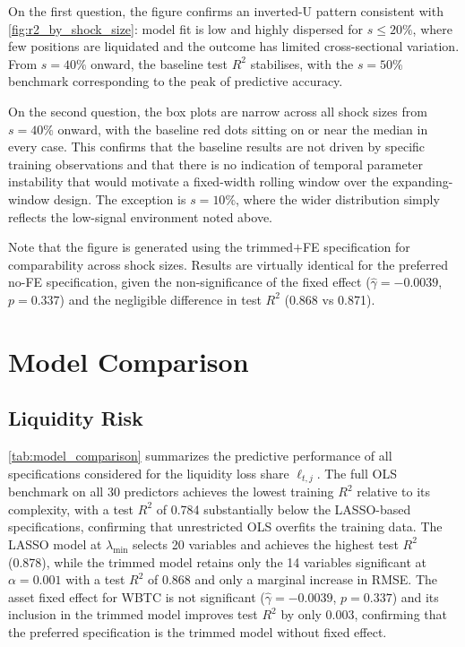 \documentclass[a4paper,UKenglish,cleveref, autoref, thm-restate]{informs3}
\begin{document}
On the first question, the figure confirms an inverted-U pattern
consistent with \autoref{fig:r2_by_shock_size}: model fit is
low and highly dispersed for $s \leq 20\%$, where few positions
are liquidated and the outcome has limited cross-sectional
variation. From $s = 40\%$ onward, the baseline test $R^2$
stabilises, with the $s = 50\%$ benchmark corresponding to the
peak of predictive accuracy.

On the second question, the box plots are narrow across all shock
sizes from $s = 40\%$ onward, with the baseline red dots sitting
on or near the median in every case. This confirms that the baseline results are not driven by specific 
training observations and that there is no indication of temporal 
parameter instability that would motivate a fixed-width rolling window 
over the expanding-window design.
The exception is $s = 10\%$, where the wider distribution simply
reflects the low-signal environment noted above.

Note that the figure is generated using the trimmed$+$FE
specification for comparability across shock sizes. Results are
virtually identical for the preferred no-FE specification, given
the non-significance of the fixed effect ($\hat{\gamma} =
-0.0039$, $p = 0.337$) and the negligible difference in test
$R^2$ (0.868 vs 0.871).


\section{Model Comparison}

\medskip

\subsection{Liquidity Risk}
\label{app:model_comparison_liq}

\autoref{tab:model_comparison} summarizes the predictive
performance of all specifications considered for the liquidity
loss share $\ell_{t,j}$. The full OLS benchmark on all 30
predictors achieves the lowest training $R^2$ relative to its
complexity, with a test $R^2$ of 0.784 substantially below the
LASSO-based specifications, confirming that unrestricted OLS
overfits the training data. The LASSO model at $\lambda_{\min}$
selects 20 variables and achieves the highest test $R^2$ (0.878),
while the trimmed model retains only the 14 variables significant
at $\alpha = 0.001$ with a test $R^2$ of 0.868 and only a
marginal increase in RMSE. The asset fixed effect for WBTC is
not significant ($\hat{\gamma} = -0.0039$, $p = 0.337$) and its
inclusion in the trimmed model improves test $R^2$ by only 0.003,
confirming that the preferred specification is the trimmed model
without fixed effect.
\end{document}
